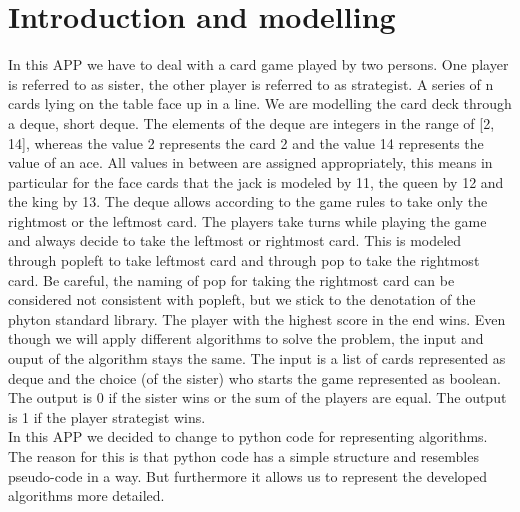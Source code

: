 \documentclass[a4paper,12pt]{article}
\begin{document}

\thispagestyle{empty}
\tableofcontents
\newpage
\section{Introduction and modelling}
In this APP we have to deal with a card game played by two persons.
One player is referred to as sister, the other player is referred to as strategist.
A series of n cards lying on the table face up in a line. We are modelling
the card deck through a \gls{deque}, short deque. The elements of the deque are integers
in the range of [2, 14], whereas the value 2 represents the card 2 and the
value 14 represents the value of an ace. All values in between are assigned
appropriately, this means in particular for the face cards that the jack
is modeled by 11, the queen by 12 and the king by 13.
The deque allows according to the game rules to take only the
rightmost or the leftmost card. The players take turns while playing the
game and always decide to take the leftmost or rightmost card. This is
modeled through \gls{popleft} to take leftmost card and through \gls{pop}
to take the rightmost card. Be careful, the naming of \gls{pop} for taking
the rightmost card can be considered not consistent with \gls{popleft}, but we
stick to the denotation of the phyton standard library. The player with
the highest score in the end wins. Even though we will apply different
algorithms to solve the problem, the input and ouput of the algorithm stays the same.
The input is a list of cards represented as deque and the choice (of the sister)
who starts the game represented as boolean. The output is 0 if the sister wins
or the sum of the players are equal. The output is 1 if the
player strategist wins.\\

In this APP we decided to change to python code for representing algorithms.
The reason for this is that python code has a simple structure and resembles
pseudo-code in a way. But furthermore it allows us to represent the developed
algorithms more detailed.\\
\end{document}
